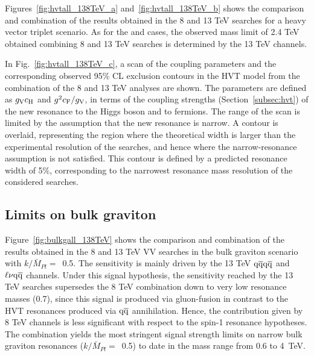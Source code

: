 Figures~\ref{fig:hvtall_138TeV_a} and~\ref{fig:hvtall_138TeV_b} shows the comparison and combination of the results obtained in the 8 and 13 TeV searches for a heavy vector triplet scenario.
As for the \Wpr and \Zpr cases, the observed mass limit of 2.4 TeV obtained combining 8 and 13 TeV searches is determined by the 13 TeV channels.

In Fig.~\ref{fig:hvtall_138TeV_c}, a scan of the coupling parameters and the corresponding observed 95\% CL exclusion contours in the HVT model from the combination of the 8 and 13 TeV analyses are shown. The parameters are defined as $g_{\rm V}c_{\rm H}$ and $g^2c_{\rm F}/g_{\rm V}$, in terms of the coupling strengths (Section~\ref{subsec:hvt}) of the new resonance to the Higgs boson and to fermions. The range of the scan is limited by the assumption that the new resonance is narrow. A contour is overlaid, representing the region where the theoretical width is larger than the experimental resolution of the searches, and hence where the narrow-resonance assumption is not satisfied. This contour is defined by a predicted resonance width of 5\%, corresponding to the narrowest resonance mass resolution of the considered searches.

\subsection{Limits on bulk graviton}

Figure~\ref{fig:bulkgall_138TeV} shows the comparison and combination of the results obtained in the 8 and 13 TeV VV searches in the bulk graviton scenario with $k/\bar{M}_{Pl}=$~0.5.
The sensitivity is mainly driven by the 13 TeV $\mathrm{q}\overline{\mathrm{q}} \mathrm{q}\overline{\mathrm{q}}$ and $\ell \nu \mathrm{q}\overline{\mathrm{q}}$ channels.
Under this signal hypothesis, the sensitivity reached by the 13 TeV searches supersedes the 8 TeV combination down to very low resonance masses (0.7\TeV), since this signal is produced via gluon-fusion in contrast to the HVT resonances produced via $\mathrm{q}\overline{\mathrm{q}}$ annihilation.
Hence, the contribution given by 8 TeV channels is less significant with respect to the spin-1 resonance hypotheses.
The combination yields the most stringent signal strength limits on narrow bulk graviton resonances ($k/\bar{M}_{Pl}=$~0.5) to date in the mass range from 0.6 to 4~TeV.

